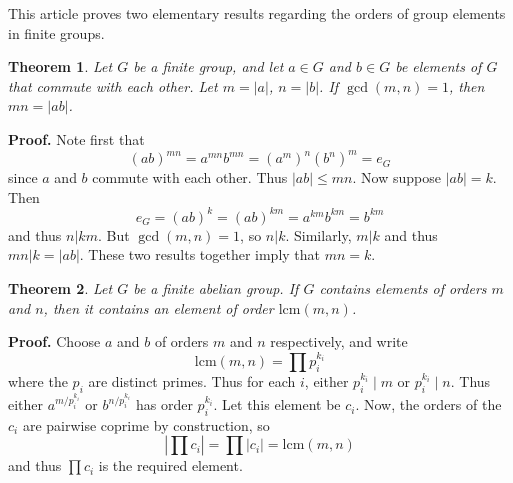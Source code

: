 \documentclass[12pt]{article}
\newtheorem{thm}{Theorem}
\begin{document}
This article proves two elementary results regarding the orders of group elements in finite groups.

\begin{thm} Let $G$ be a finite group, and let $a\in G$ and $b\in G$ be elements of $G$ that commute with each other. Let $m=\lvert a\rvert$, $n=\lvert b\rvert$. If $\gcd(m,n)=1$, then $mn=\lvert ab\rvert$.
\end{thm}
\textbf{Proof. }
Note first that
\[(ab)^{mn}=a^{mn}b^{mn}=(a^m)^n(b^n)^m=e_G\]
since $a$ and $b$ commute with each other. Thus $\lvert ab\rvert \leq mn$. Now suppose $\lvert ab\rvert=k$. Then
\[e_G=(ab)^k=(ab)^{km}=a^{km}b^{km}=b^{km}\]
and thus $n|km$. But $\gcd(m,n)=1$, so $n|k$. Similarly, $m|k$ and thus $mn|k=\lvert ab\rvert$. These two results together imply that $mn=k$.

\begin{thm} Let $G$ be a finite abelian group. If $G$ contains elements of orders $m$ and $n$, then it contains an element of order $\mathrm{lcm}(m,n)$. 
\end{thm}
\textbf{Proof. } 
Choose $a$ and $b$ of orders $m$ and $n$ respectively, and write
\[\mathrm{lcm}(m,n)=\prod p_i^{k_i}\]
where the $p_i$ are distinct primes. Thus for each $i$, either $p_i^{k_i}\mid m$ or $p_i^{k_i}\mid n$. Thus either $a^{m/p_i^{k_i}}$ or $b^{n/p_i^{k_i}}$ has order $p_i^{k_i}$. Let this element be $c_i$. Now, the orders of the $c_i$ are pairwise coprime by construction, so 
\[\left\lvert \prod c_i\right\rvert=\prod \left\lvert c_i\right\rvert=\mathrm{lcm}(m,n)\]
and thus $\prod c_i$ is the required element.

\end{document}
